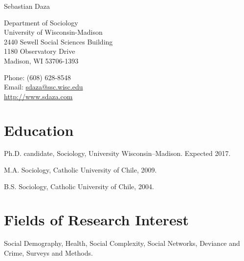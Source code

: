 \documentclass[10pt,letterpaper]{article}
\def\name{Sebastian Daza}
\renewenvironment{itemize}{
  \begin{list}{}{
    \setlength{\leftmargin}{1.5em}
    \setlength{\itemsep}{0.25em}
    \setlength{\parskip}{0pt}
    \setlength{\parsep}{0.25em}
  }
}{
  \end{list}
}
\begin{document}

\centerline{\huge \name}

\bigskip
\bigskip

\begin{minipage}[t]{.75\textwidth}
  Department of Sociology \\
  University of Wisconsin-Madison \\
  2440 Sewell Social Sciences Building \\
  1180 Observatory Drive \\
  Madison, WI 53706-1393 \\
\end{minipage}
\begin{minipage}[t]{0.3\textwidth}
  Phone: (608) 628-8548 \\
  Email: \href{mailto:sdaza@ssc.wisc.edu}{sdaza@ssc.wisc.edu} \\
  \href{http://sdaza.com/}{http://www.sdaza.com} \\

\end{minipage}

\bigskip
\bigskip

\section*{Education}

\begin{itemize}
  \item Ph.D. candidate, Sociology, University Wisconsin--Madison. Expected 2017.
  \item M.A. Sociology, Catholic University of Chile, 2009.
  \item B.S. Sociology, Catholic University of Chile, 2004.
\end{itemize}

\section*{Fields of Research Interest}

\begin{itemize}
\item Social Demography, Health, Social Complexity, Social Networks, Deviance and Crime, Surveys and Methods.
\end{itemize}
\end{document}
